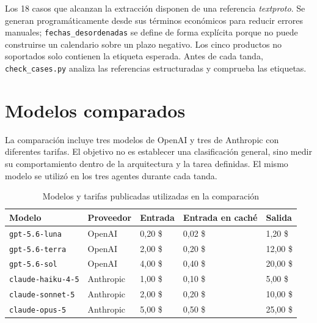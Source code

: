 Los 18 casos que alcanzan la extracción disponen de una referencia \textit{textproto}. Se generan programáticamente desde sus términos económicos para reducir errores manuales; \texttt{fechas\_desordenadas} se define de forma explícita porque no puede construirse un calendario sobre un plazo negativo. Los cinco productos no soportados solo contienen la etiqueta esperada. Antes de cada tanda, \texttt{check\_cases.py} analiza las referencias estructuradas y comprueba las etiquetas.

\section{Modelos comparados}
\label{sec:modelos_comparados}

La comparación incluye tres modelos de OpenAI y tres de Anthropic con diferentes tarifas. El objetivo no es establecer una clasificación general, sino medir su comportamiento dentro de la arquitectura y la tarea definidas. El mismo modelo se utilizó en los tres agentes durante cada tanda.

\begin{table}[H]
\centering
\small
\caption{Modelos y tarifas publicadas utilizadas en la comparación}
\label{tab:modelos_comparados}
\begin{tabular}{|P{3.6cm}|P{2.0cm}|P{2.3cm}|P{2.3cm}|P{2.3cm}|}
\hline
\textbf{Modelo} & \textbf{Proveedor} & \textbf{Entrada} & \textbf{Entrada en caché} & \textbf{Salida} \\
\hline
\texttt{gpt-5.6-luna} & OpenAI & 0,20 \$ & 0,02 \$ & 1,20 \$ \\
\hline
\texttt{gpt-5.6-terra} & OpenAI & 2,00 \$ & 0,20 \$ & 12,00 \$ \\
\hline
\texttt{gpt-5.6-sol} & OpenAI & 4,00 \$ & 0,40 \$ & 20,00 \$ \\
\hline
\texttt{claude-haiku-4-5} & Anthropic & 1,00 \$ & 0,10 \$ & 5,00 \$ \\
\hline
\texttt{claude-sonnet-5} & Anthropic & 2,00 \$ & 0,20 \$ & 10,00 \$ \\
\hline
\texttt{claude-opus-5} & Anthropic & 5,00 \$ & 0,50 \$ & 25,00 \$ \\
\hline
\end{tabular}
\end{table}

